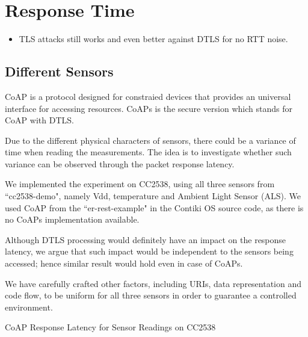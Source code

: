 \section{Response Time}
\begin{itemize}
	\item TLS attacks still works and even better against DTLS for no RTT noise. 
\end{itemize}

\subsection{Different Sensors}

CoAP\cite{rfc7252} is a protocol designed for constraied devices that provides an universal interface for accessing resources. CoAPs is the secure version which stands for CoAP with DTLS.

Due to the different physical characters of sensors, there could be a variance of time when reading the measurements. The idea is to investigate whether such variance can be observed through the packet response latency.

We implemented the experiment on CC2538, using all three sensors from ``cc2538-demo", namely Vdd, temperature and Ambient Light Sensor (ALS). We used CoAP from the ``er-rest-example" in the Contiki OS source code, as there is no CoAPs implementation available. 

Although DTLS processing would definitely have an impact on the response latency, we argue that such impact would be independent to the sensors being accessed; hence similar result would hold even in case of CoAPs.

We have carefully crafted other factors, including URIs, data representation and code flow, to be uniform for all three sensors in order to guarantee a controlled environment.

\begin{table}
	\center
	
	\caption{CoAP Response Latency for Sensor Readings on CC2538\label{CoapTiming}}
\end{table}

